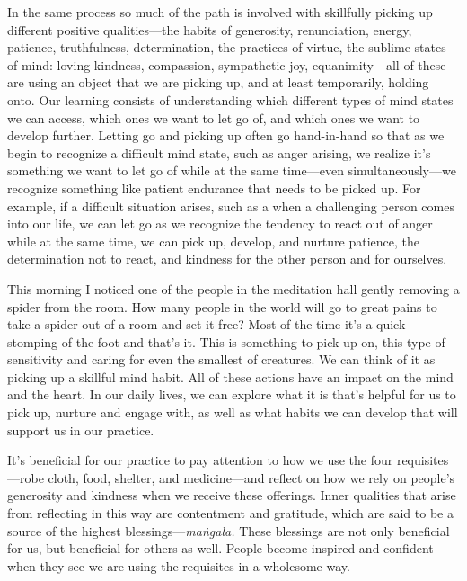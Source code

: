In the same process so much of the path is involved with skillfully 
picking up different positive qualities---the habits of generosity, 
renunciation, energy, patience, truthfulness, determination, the 
practices of virtue, the sublime states of mind: loving-kindness, 
compassion, sympathetic joy, equanimity---all of these are using an 
object that we are picking up, and at least temporarily, holding onto. 
Our learning consists of understanding which different types of mind 
states we can access, which ones we want to let go of, and which ones 
we want to develop further. Letting go and picking up often go 
hand-in-hand so that as we begin to recognize a difficult mind state, 
such as anger arising, we realize it's something we want to let go of 
while at the same time---even simultaneously---we recognize something 
like patient endurance that needs to be picked up. For example, if a 
difficult situation arises, such as a when a challenging person comes 
into our life, we can let go as we recognize the tendency to react out 
of anger while at the same time, we can pick up, develop, and nurture 
patience, the determination not to react, and kindness for the other 
person and for ourselves.

This morning I noticed one of the people in the meditation hall gently 
removing a spider from the room. How many people in the world will go 
to great pains to take a spider out of a room and set it free? Most of 
the time it's a quick stomping of the foot and that's it. This is 
something to pick up on, this type of sensitivity and caring for even 
the smallest of creatures. We can think of it as picking up a skillful 
mind habit. All of these actions have an impact on the mind and the 
heart. In our daily lives, we can explore what it is that's helpful for 
us to pick up, nurture and engage with, as well as what habits we can 
develop that will support us in our practice.


It's beneficial for our practice to pay attention to how we use the 
four requisites---robe cloth, food, shelter, and medicine---and reflect 
on how we rely on people's generosity and kindness when we receive 
these offerings. Inner qualities that arise from reflecting in this way 
are contentment and gratitude, which are said to be a source of the 
highest blessings---\emph{maṅgala.} These blessings are not only 
beneficial for us, but beneficial for others as well. People become 
inspired and confident when they see we are using the requisites in a 
wholesome way.

